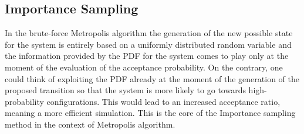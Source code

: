 \subsection{Importance Sampling}
In the brute-force Metropolis algorithm the generation of the new possible state for the system is entirely based on a uniformly distributed random variable and the information provided by the PDF for the system comes to play only at the moment of the evaluation of the acceptance probability. On the contrary, one could think of exploiting the PDF already at the moment of the generation of the proposed transition so that the system is more likely to go towards high-probability configurations. This would lead to an increased acceptance ratio, meaning a more efficient simulation. This is the core of the Importance sampling method in the context of Metropolis algorithm.

